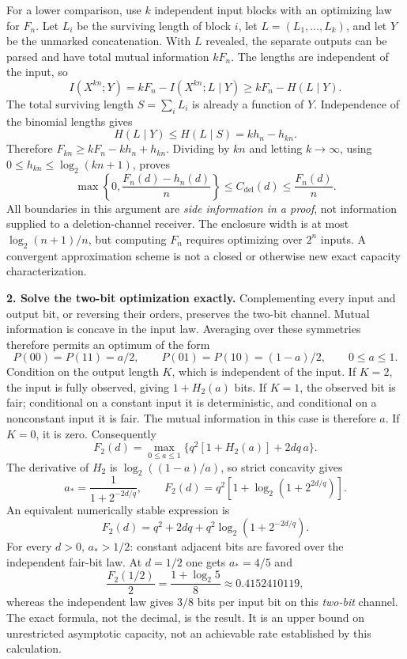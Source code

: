 \documentclass[11pt,a4paper]{article}
\numberwithin{equation}{section}
\begin{document}
For a lower comparison, use $k$ independent input blocks with an
optimizing law for $F_n$. Let $L_i$ be the surviving length of block $i$,
let $L=(L_1,\ldots,L_k)$, and let $Y$ be the unmarked concatenation.
With $L$ revealed, the separate outputs can be parsed and have total
mutual information $kF_n$. The lengths are independent of the input, so
\[
 I(X^{kn};Y)=kF_n-I(X^{kn};L\mid Y)
          \ge kF_n-H(L\mid Y).
\]
The total surviving length $S=\sum_iL_i$ is already a function of $Y$.
Independence of the binomial lengths gives
\[
 H(L\mid Y)\le H(L\mid S)=kh_n-h_{kn}.
\]
Therefore $F_{kn}\ge kF_n-kh_n+h_{kn}$. Dividing by $kn$ and letting
$k\to\infty$, using $0\le h_{kn}\le\log_2(kn+1)$, proves
\begin{equation}\label{30006798:enclosure}
 \max\left\{0,\frac{F_n(d)-h_n(d)}n\right\}
 \le C_{\mathrm{del}}(d)\le\frac{F_n(d)}n.
\end{equation}
All boundaries in this argument are \emph{side information in a proof},
not information supplied to a deletion-channel receiver.
The enclosure width is at most $\log_2(n+1)/n$, but computing $F_n$
requires optimizing over $2^n$ inputs. A convergent approximation scheme
is not a closed or otherwise new exact capacity characterization.

\textbf{2. Solve the two-bit optimization exactly.}
Complementing every input and output bit, or reversing their orders,
preserves the two-bit channel. Mutual information is concave in the
input law. Averaging over these symmetries therefore permits an optimum
of the form
\[
 P(00)=P(11)=a/2,\qquad P(01)=P(10)=(1-a)/2,
 \qquad0\le a\le1.
\]
Condition on the output length $K$, which is independent of the input.
If $K=2$, the input is fully observed, giving $1+H_2(a)$ bits. If
$K=1$, the observed bit is fair; conditional on a constant input it is
deterministic, and conditional on a nonconstant input it is fair. The
mutual information in this case is therefore $a$. If $K=0$, it is zero.
Consequently
\begin{equation}\label{30006798:twobit}
 F_2(d)=\max_{0\le a\le1}
 \{q^2[1+H_2(a)]+2dq\,a\}.
\end{equation}
The derivative of $H_2$ is $\log_2((1-a)/a)$, so strict concavity gives
\[
 a_* =\frac1{1+2^{-2d/q}},\qquad
 F_2(d)=q^2\left[1+\log_2(1+2^{2d/q})\right].
\]
An equivalent numerically stable expression is
\begin{equation}\label{30006798:closed}
 F_2(d)=q^2+2dq+q^2\log_2(1+2^{-2d/q}).
\end{equation}
For every $d>0$, $a_*>1/2$: constant adjacent bits are favored over the
independent fair-bit law. At $d=1/2$ one gets $a_*=4/5$ and
\[
 \frac{F_2(1/2)}2=\frac{1+\log_2 5}{8}
                  \approx0.4152410119,
\]
whereas the independent law gives $3/8$ bits per input bit on this
\emph{two-bit} channel. The exact formula, not the decimal, is the result.
It is an upper bound on unrestricted asymptotic capacity, not an
achievable rate established by this calculation.
\end{document}
